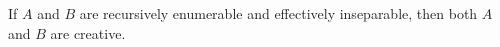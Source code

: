If $A$ and $B$ are recursively enumerable and effectively inseparable, then both $A$ and $B$ are creative.
